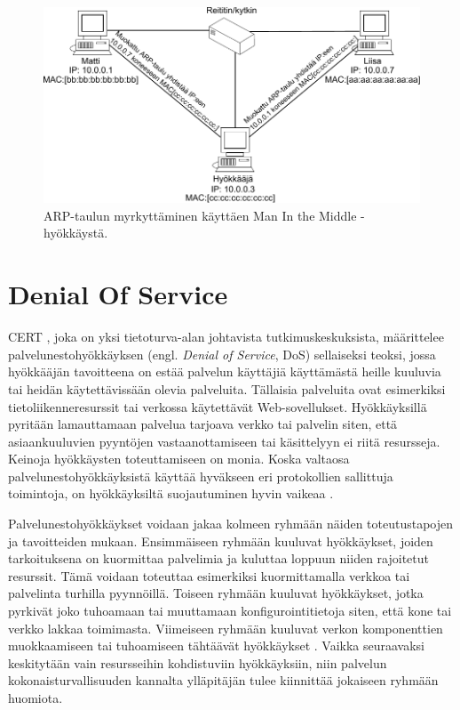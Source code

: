 \begin{figure}[ht]
\centering
\includegraphics[width=12cm]{pics/arp.pdf}
\caption{ARP-taulun myrkyttäminen käyttäen Man In the Middle -hyökkäystä.}
\label{ARP-spoofing}
\end{figure}

\section{Denial Of Service}

CERT \cite{CERT}, joka on yksi tietoturva-alan johtavista
tutkimuskeskuksista, määrittelee palvelunestohyökkäyksen
(engl. \textit{Denial of Service}, DoS) sellaiseksi teoksi, jossa
hyökkääjän tavoitteena on estää palvelun käyttäjiä käyttämästä heille
kuuluvia tai heidän käytettävissään olevia palveluita. Tällaisia
palveluita ovat esimerkiksi tietoliikenneresurssit tai verkossa
käytettävät Web-sovellukset. Hyökkäyksillä pyritään lamauttamaan
palvelua tarjoava verkko tai palvelin siten, että asiaankuuluvien
pyyntöjen vastaanottamiseen tai käsittelyyn ei riitä
resursseja. Keinoja hyökkäysten toteuttamiseen on monia. Koska
valtaosa palvelunestohyökkäyksistä käyttää hyväkseen eri protokollien
sallittuja toimintoja, on hyökkäyksiltä suojautuminen hyvin vaikeaa
\cite{Hacking}.

Palvelunestohyökkäykset voidaan jakaa kolmeen ryhmään näiden
toteutustapojen ja tavoitteiden mukaan. Ensimmäiseen ryhmään kuuluvat
hyökkäykset, joiden tarkoituksena on kuormittaa palvelimia ja kuluttaa
loppuun niiden rajoitetut resurssit. Tämä voidaan toteuttaa esimerkiksi
kuormittamalla verkkoa tai palvelinta turhilla pyynnöillä. Toiseen
ryhmään kuuluvat hyökkäykset, jotka pyrkivät joko tuhoamaan tai
muuttamaan konfigurointitietoja siten, että kone tai verkko lakkaa
toimimasta. Viimeiseen ryhmään kuuluvat verkon komponenttien
muokkaamiseen tai tuhoamiseen tähtäävät hyökkäykset
\cite{CERT}. Vaikka seuraavaksi keskitytään vain resursseihin
kohdistuviin hyökkäyksiin, niin palvelun kokonaisturvallisuuden
kannalta ylläpitäjän tulee kiinnittää jokaiseen ryhmään
huomiota.

